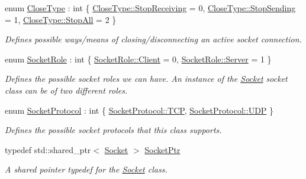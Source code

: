 \begin{DoxyCompactItemize}
\item 
enum \hyperlink{class_senergy_1_1_networking_1_1_socket_a9a69a0d516b18e2a3bec77dc032b9993}{Close\-Type} \-: int \{ \hyperlink{class_senergy_1_1_networking_1_1_socket_a9a69a0d516b18e2a3bec77dc032b9993a1851aea8452370ffbc6364027d018da9}{Close\-Type\-::\-Stop\-Receiving} = 0, 
\hyperlink{class_senergy_1_1_networking_1_1_socket_a9a69a0d516b18e2a3bec77dc032b9993a948c383a847087d69042e091d164380b}{Close\-Type\-::\-Stop\-Sending} = 1, 
\hyperlink{class_senergy_1_1_networking_1_1_socket_a9a69a0d516b18e2a3bec77dc032b9993a40b522922220c34afd8e1d4a3ba02208}{Close\-Type\-::\-Stop\-All} = 2
 \}
\begin{DoxyCompactList}\small\item\em Defines possible ways/means of closing/disconnecting an active socket connection. \end{DoxyCompactList}\item 
enum \hyperlink{class_senergy_1_1_networking_1_1_socket_a78ca8d55b9849962428e844d3bf4ff49}{Socket\-Role} \-: int \{ \hyperlink{class_senergy_1_1_networking_1_1_socket_a78ca8d55b9849962428e844d3bf4ff49a577d7068826de925ea2aec01dbadf5e4}{Socket\-Role\-::\-Client} = 0, 
\hyperlink{class_senergy_1_1_networking_1_1_socket_a78ca8d55b9849962428e844d3bf4ff49a9aa1b03934893d7134a660af4204f2a9}{Socket\-Role\-::\-Server} = 1
 \}
\begin{DoxyCompactList}\small\item\em Defines the possible socket roles we can have. An instance of the \hyperlink{class_senergy_1_1_networking_1_1_socket}{Socket} socket class can be of two different roles. \end{DoxyCompactList}\item 
enum \hyperlink{class_senergy_1_1_networking_1_1_socket_a83b2c6873ed6de08855f226e473d9eb9}{Socket\-Protocol} \-: int \{ \hyperlink{class_senergy_1_1_networking_1_1_socket_a83b2c6873ed6de08855f226e473d9eb9ab136ef5f6a01d816991fe3cf7a6ac763}{Socket\-Protocol\-::\-T\-C\-P}, 
\hyperlink{class_senergy_1_1_networking_1_1_socket_a83b2c6873ed6de08855f226e473d9eb9af5ef036b4d8b630721e51fe23489fbc9}{Socket\-Protocol\-::\-U\-D\-P}
 \}
\begin{DoxyCompactList}\small\item\em Defines the possible socket protocols that this class supports. \end{DoxyCompactList}\item 
typedef std\-::shared\-\_\-ptr$<$ \hyperlink{class_senergy_1_1_networking_1_1_socket}{Socket} $>$ \hyperlink{class_senergy_1_1_networking_1_1_socket_a19cb724ef153aebdbcc66cd4c3c4952a}{Socket\-Ptr}
\begin{DoxyCompactList}\small\item\em A shared pointer typedef for the \hyperlink{class_senergy_1_1_networking_1_1_socket}{Socket} class. \end{DoxyCompactList}\end{DoxyCompactItemize}
